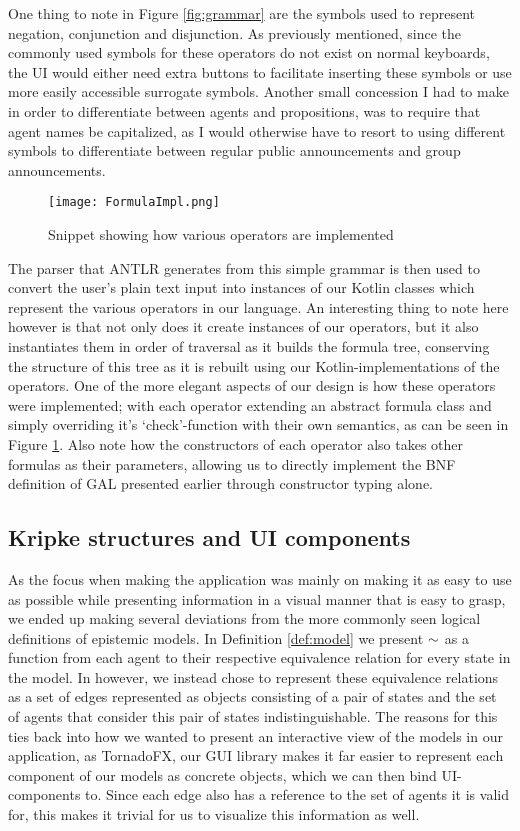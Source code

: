 One thing to note in Figure \ref{fig:grammar} are the symbols used to represent negation, conjunction and disjunction. As previously mentioned, since the commonly used symbols for these operators do not exist on normal keyboards, the UI would either need extra buttons to facilitate inserting these symbols or use more easily accessible surrogate symbols. Another small concession I had to make in order to differentiate between agents and propositions, was to require that agent names be capitalized, as I would otherwise have to resort to using different symbols to differentiate between regular public announcements and group announcements. 

\begin{figure}[h]
	\label{fig:formulaImpl}
	\texttt{[image: FormulaImpl.png]}
	\caption{Snippet showing how various operators are implemented}
\end{figure}

The parser that ANTLR generates from this simple grammar is then used to convert the user's plain text input into instances of our Kotlin classes which represent the various operators in our language. An interesting thing to note here however is that not only does it create instances of our operators, but it also instantiates them in order of traversal as it builds the formula tree, conserving the structure of this tree as it is rebuilt using our Kotlin-implementations of the operators. One of the more elegant aspects of our design is how these operators were implemented; with each operator extending an abstract formula class and simply overriding it's `check'-function with their own semantics, as can be seen in Figure \ref{fig:formulaImpl}. Also note how the constructors of each operator also takes other formulas as their parameters, allowing us to directly implement the BNF definition of GAL presented earlier through constructor typing alone.

\subsection{Kripke structures and UI components}

As the focus when making the application was mainly on making it as easy to use as possible while presenting information in a visual manner that is easy to grasp, we ended up making several deviations from the more commonly seen logical definitions of epistemic models. In Definition \ref{def:model} we present $\sim$ as a function from each agent to their respective equivalence relation for every state in the model. In \cname{} however, we instead chose to represent these equivalence relations as a set of edges represented as objects consisting of a pair of states and the set of agents that consider this pair of states indistinguishable. The reasons for this ties back into how we wanted to present an interactive view of the models in our application, as TornadoFX, our GUI library makes it far easier to represent each component of our models as concrete objects, which we can then bind UI-components to. Since each edge also has a reference to the set of agents it is valid for, this makes it trivial for us to visualize this information as well. 

